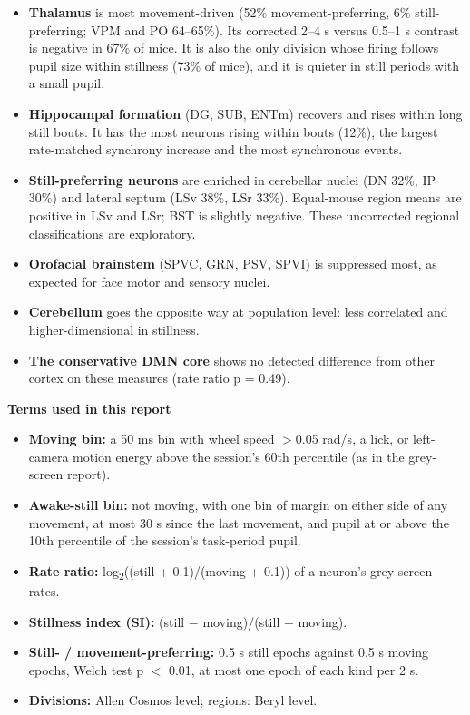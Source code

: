 \documentclass[10pt,a4paper]{article}
\begin{document}
\begin{itemize}
\item \textbf{Thalamus} is most movement-driven (52\% movement-preferring, 6\% still-preferring; VPM and PO 64--65\%). Its corrected 2--4 s versus 0.5--1 s contrast is negative in 67\% of mice. It is also the only division whose firing follows pupil size within stillness (73\% of mice), and it is quieter in still periods with a small pupil.
\item \textbf{Hippocampal formation} (DG, SUB, ENTm) recovers and rises within long still bouts. It has the most neurons rising within bouts (12\%), the largest rate-matched synchrony increase and the most synchronous events.
\item \textbf{Still-preferring neurons} are enriched in cerebellar nuclei (DN 32\%, IP 30\%) and lateral septum (LSv 38\%, LSr 33\%). Equal-mouse region means are positive in LSv and LSr; BST is slightly negative. These uncorrected regional classifications are exploratory.
\item \textbf{Orofacial brainstem} (SPVC, GRN, PSV, SPVI) is suppressed most, as expected for face motor and sensory nuclei.
\item \textbf{Cerebellum} goes the opposite way at population level: less correlated and higher-dimensional in stillness.
\item \textbf{The conservative DMN core} shows no detected difference from other cortex on these measures (rate ratio p = 0.49).
\end{itemize}
\begin{tcolorbox}[breakable,colback=accent!8,colframe=accent,boxrule=0pt,leftrule=2pt,arc=0pt,fontupper=\small]
\textbf{Terms used in this report}

\begin{itemize}
\item \textbf{Moving bin:} a 50 ms bin with wheel speed $>$0.05 rad/s, a lick, or left-camera motion energy above the session's 60th percentile (as in the grey-screen report).
\item \textbf{Awake-still bin:} not moving, with one bin of margin on either side of any movement, at most 30 s since the last movement, and pupil at or above the 10th percentile of the session's task-period pupil.
\item \textbf{Rate ratio:} log\textsubscript{2}((still + 0.1)/(moving + 0.1)) of a neuron's grey-screen rates.
\item \textbf{Stillness index (SI):} (still $-$ moving)/(still + moving).
\item \textbf{Still- / movement-preferring:} 0.5 s still epochs against 0.5 s moving epochs, Welch test p $<$ 0.01, at most one epoch of each kind per 2 s.
\item \textbf{Divisions:} Allen Cosmos level; regions: Beryl level.
\end{itemize}
\end{tcolorbox}
\end{document}
